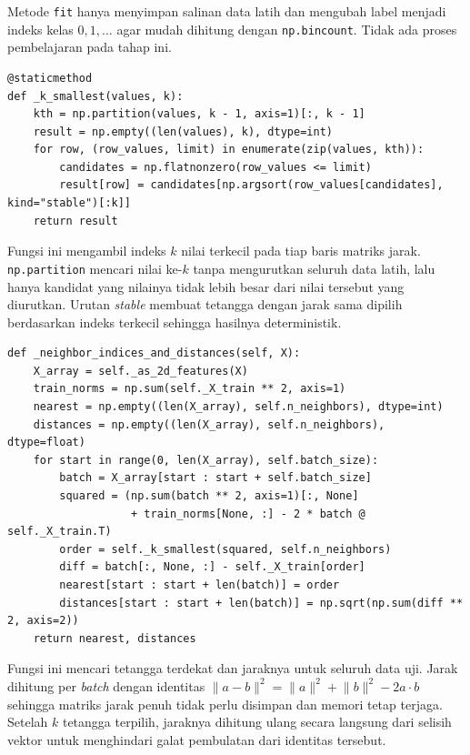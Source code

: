 Metode \texttt{fit} hanya menyimpan salinan data latih dan mengubah label
menjadi indeks kelas $0, 1, \dots$ agar mudah dihitung dengan
\texttt{np.bincount}. Tidak ada proses pembelajaran pada tahap ini.

\begin{lstlisting}
@staticmethod
def _k_smallest(values, k):
    kth = np.partition(values, k - 1, axis=1)[:, k - 1]
    result = np.empty((len(values), k), dtype=int)
    for row, (row_values, limit) in enumerate(zip(values, kth)):
        candidates = np.flatnonzero(row_values <= limit)
        result[row] = candidates[np.argsort(row_values[candidates], kind="stable")[:k]]
    return result
\end{lstlisting}

Fungsi ini mengambil indeks $k$ nilai terkecil pada tiap baris matriks jarak.
\texttt{np.partition} mencari nilai ke-$k$ tanpa mengurutkan seluruh data
latih, lalu hanya kandidat yang nilainya tidak lebih besar dari nilai tersebut
yang diurutkan. Urutan \textit{stable} membuat tetangga dengan jarak sama
dipilih berdasarkan indeks terkecil sehingga hasilnya deterministik.

\begin{lstlisting}
def _neighbor_indices_and_distances(self, X):
    X_array = self._as_2d_features(X)
    train_norms = np.sum(self._X_train ** 2, axis=1)
    nearest = np.empty((len(X_array), self.n_neighbors), dtype=int)
    distances = np.empty((len(X_array), self.n_neighbors), dtype=float)
    for start in range(0, len(X_array), self.batch_size):
        batch = X_array[start : start + self.batch_size]
        squared = (np.sum(batch ** 2, axis=1)[:, None]
                   + train_norms[None, :] - 2 * batch @ self._X_train.T)
        order = self._k_smallest(squared, self.n_neighbors)
        diff = batch[:, None, :] - self._X_train[order]
        nearest[start : start + len(batch)] = order
        distances[start : start + len(batch)] = np.sqrt(np.sum(diff ** 2, axis=2))
    return nearest, distances
\end{lstlisting}

Fungsi ini mencari tetangga terdekat dan jaraknya untuk seluruh data uji.
Jarak dihitung per \textit{batch} dengan identitas
$\lVert a-b\rVert^2=\lVert a\rVert^2+\lVert b\rVert^2-2a\cdot b$ sehingga
matriks jarak penuh tidak perlu disimpan dan memori tetap terjaga. Setelah
$k$ tetangga terpilih, jaraknya dihitung ulang secara langsung dari selisih
vektor untuk menghindari galat pembulatan dari identitas tersebut.

